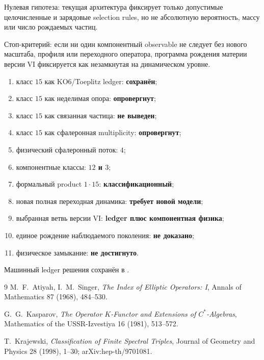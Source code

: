 Нулевая гипотеза: текущая архитектура фиксирует только допустимые
целочисленные и зарядовые selection rules, но не абсолютную вероятность,
массу или число рождаемых частиц.

Стоп-критерий: если ни один компонентный observable не следует без
нового масштаба, профиля или переходного оператора, программа рождения
материи версии VI фиксируется как незамкнутая на динамическом уровне.

\begin{protocol}
\begin{enumerate}
 \item класс $15$ как KO6/Toeplitz ledger: \textbf{сохранён};
 \item класс $15$ как неделимая опора: \textbf{опровергнут};
 \item класс $15$ как связанная частица: \textbf{не выведен};
 \item класс $15$ как сфалеронная multiplicity: \textbf{опровергнут};
 \item физический сфалеронный поток: \textbf{$4$};
 \item компонентные классы: \textbf{$12$ и $3$};
 \item формальный product $1\cdot15$: \textbf{классификационный};
 \item новая полная переходная динамика: \textbf{требует новой модели};
 \item выбранная ветвь версии VI:
 \textbf{ledger плюс компонентная физика};
 \item единое рождение наблюдаемого поколения: \textbf{не доказано};
 \item физическое замыкание: \textbf{не достигнуто}.
\end{enumerate}
\end{protocol}

Машинный ledger решения сохранён в
.

\begin{thebibliography}{9}
M.~F.~Atiyah, I.~M.~Singer,
\emph{The Index of Elliptic Operators: I},
Annals of Mathematics 87 (1968), 484--530.

G.~G.~Kasparov,
\emph{The Operator $K$-Functor and Extensions of $C^*$-Algebras},
Mathematics of the USSR-Izvestiya 16 (1981), 513--572.

T.~Krajewski,
\emph{Classification of Finite Spectral Triples},
Journal of Geometry and Physics 28 (1998), 1--30;
arXiv:hep-th/9701081.
\end{thebibliography}